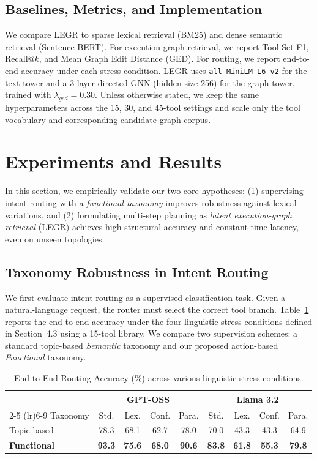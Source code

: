 \documentclass{article}
\begin{document}
\subsection{Baselines, Metrics, and Implementation}
We compare LEGR to sparse lexical retrieval (BM25) and dense semantic retrieval (Sentence-BERT). For execution-graph retrieval, we report Tool-Set F1, Recall@$k$, and Mean Graph Edit Distance (GED). For routing, we report end-to-end accuracy under each stress condition. LEGR uses \texttt{all-MiniLM-L6-v2} for the text tower and a 3-layer directed GNN (hidden size 256) for the graph tower, trained with $\lambda_{ged}=0.30$. Unless otherwise stated, we keep the same hyperparameters across the 15, 30, and 45-tool settings and scale only the tool vocabulary and corresponding candidate graph corpus.


\section{Experiments and Results}

In this section, we empirically validate our two core hypotheses: (1) supervising intent routing with a \emph{functional taxonomy} improves robustness against lexical variations, and (2) formulating multi-step planning as \emph{latent execution-graph retrieval} (LEGR) achieves high structural accuracy and constant-time latency, even on unseen topologies.

\subsection{Taxonomy Robustness in Intent Routing}
We first evaluate intent routing as a supervised classification task. Given a natural-language request, the router must select the correct tool branch. Table~\ref{tab:routing_results} reports the end-to-end accuracy under the four linguistic stress conditions defined in Section~4.3 using a 15-tool library. We compare two supervision schemes: a standard topic-based \emph{Semantic} taxonomy and our proposed action-based \emph{Functional} taxonomy.

\begin{table}[h]
\caption{End-to-End Routing Accuracy (\%) across various linguistic stress conditions.}
\label{tab:routing_results}
\centering
\begin{tabular}{@{}lcccccccc@{}}
\toprule
& \multicolumn{4}{c}{\textbf{GPT-OSS}} & \multicolumn{4}{c}{\textbf{Llama 3.2}} \\
\cmidrule(lr){2-5} \cmidrule(lr){6-9}
Taxonomy & Std. & Lex. & Conf. & Para. & Std. & Lex. & Conf. & Para. \\
\midrule
Topic-based & 78.3 & 68.1 & 62.7 & 78.0 & 70.0 & 43.3 & 43.3 & 64.9 \\
\textbf{Functional} & \textbf{93.3} & \textbf{75.6} & \textbf{68.0} & \textbf{90.6} & \textbf{83.8} & \textbf{61.8} & \textbf{55.3} & \textbf{79.8} \\
\bottomrule
\end{tabular}
\end{table}
\end{document}
